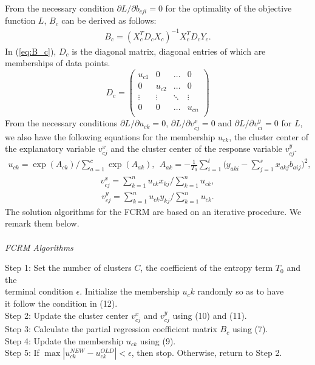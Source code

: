 \documentclass{article}
\begin{document}
From the necessary condition $ {\partial L}/{\partial b_{cji}} = 0$ for the optimality of the objective function $L$, $B_c$ can be derived as follows:
%
\begin{eqnarray}
B_c = (X_c^T D_c X_c)^{-1} X_c^T D_c Y_c.
\label{eq:B_c}
\end{eqnarray}
%
In (\ref{eq:B_c}), $D_c$ is the diagonal matrix, diagonal entries of which are memberships of data points.
%
\[D_c = \left(
\begin{array}{cccc}
u_{c1} & 0 & \ldots & 0 \\
0 & u_{c2} & \ldots & 0 \\
\vdots & \vdots & \ddots & \vdots \\
0 & 0 & \ldots & u_{cn} \\
\end{array}
\right) \]
%
From the necessary conditions ${\partial L}/{\partial u_{ck}} = 0$, ${\partial L}/{\partial v_{cj}^x} = 0$ and ${\partial L}/{\partial v_{ci}^y} = 0$ for $L$, we also have the following equations for the membership $u_{ck}$, the cluster center of the explanatory variable $v_{cj}^x$ and the cluster center of the response variable $v_{cj}^y$.
%
\begin{eqnarray}
	u_{ck} = \exp (A_{ck}) / \displaystyle{\sum_{a=1}^c \exp( A_{ak})}, \ \  
	A_{ak} = - \frac{1}{T_0}\sum_{i=1}^t \Big( y_{aki} - \sum_{j=1}^s x_{akj}b_{aij} \Big)^2, \end{eqnarray}
%
\begin{eqnarray}
v_{cj}^x = \displaystyle{\sum_{k=1}^n u_{ck} x_{kj}} / \displaystyle{\sum_{k=1}^n u_{ck}},
\end{eqnarray}
%
\begin{eqnarray}
v_{cj}^y = \displaystyle{\sum_{k=1}^n u_{ck} y_{kj}} / \displaystyle{\sum_{k=1}^n u_{ck}}.
\end{eqnarray}
%
The solution algorithms for the FCRM are based on an iterative procedure. We remark them below.
\\ \\
\noindent
{\it FCRM Algorithms}

\noindent
Step 1: Set the number of clusters $C$, the coefficient of the entropy term $T_0$ and the\\ 
\hspace*{13mm} terminal condition $\epsilon$. Initialize the membership $u_ck$ randomly so as to have \\
\hspace*{13mm} it follow the condition in (12).\\
Step 2: Update the cluster center $v_{cj}^x$ and $v_{cj}^y$ using (10) and (11).\\
Step 3: Calculate the partial regression coefficient matrix $B_c$ using (7).\\
Step 4: Update the membership $u_{ck}$ using (9).\\
Step 5: If $\max | u_{ck}^{NEW} - u_{ck}^{OLD} | < \epsilon $, then stop. Otherwise, return to Step 2.
\\
\end{document}
